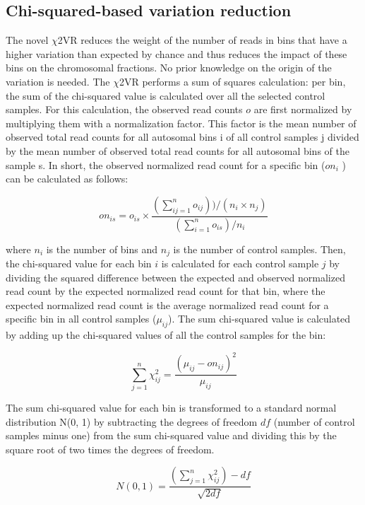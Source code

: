 \subsection{Chi-squared-based variation reduction}
The novel $\chi$2VR reduces the weight of the number of reads in bins that have a higher variation than expected by chance and thus reduces the impact of these bins on the chromosomal fractions. 
No prior knowledge on the origin of the variation is needed. 
The $\chi$2VR performs a sum of squares calculation: per bin, the sum of the chi-squared value is calculated over all the selected control samples. 
For this calculation, the observed read counts $o$ are first normalized by multiplying them with a normalization factor. 
This factor is the mean number of observed total read counts for all autosomal bins i of all control samples j divided by the mean number of observed total read counts for all autosomal bins of the sample s. 
In short, the observed normalized read count for a specific bin ($on_i$ ) can be calculated as follows:

\begin{equation*}
	on_{is} = o_{is} \times \frac{(\sum^n_{ij=1}o_{ij})) / (n_i \times n_j)}{(\sum^n_{i=1}o_{is})/n_i}
\end{equation*}


\noindent where $n_i$ is the number of bins and $n_j$ is the number of control samples. 
Then, the chi-squared value for each bin $i$ is calculated for each control sample $j$ by dividing the squared difference between the expected and observed normalized read count by the expected normalized read count for that bin, where the expected normalized read count is the average normalized read count for a specific bin in all control samples ($\mu_{ij}$). 
The sum chi-squared value is calculated by adding up the chi-squared values of all the control samples for the bin:

\begin{equation*}
	\sum^n_{j=1}\chi_{ij}^2 = \frac{(\mu_{ij} - on_{ij})^2}{\mu_{ij}}
\end{equation*}

\noindent The sum chi-squared value for each bin is transformed to a standard normal distribution N(0, 1) by subtracting the degrees of freedom $df$ (number of control samples minus one) from the sum chi-squared value and dividing this by the square root of two times the degrees of freedom.

\begin{equation*}
	N(0,1) = \frac{(\sum^n_{j=1}\chi_{ij}^2) - df} {\sqrt{2df}}
\end{equation*}

